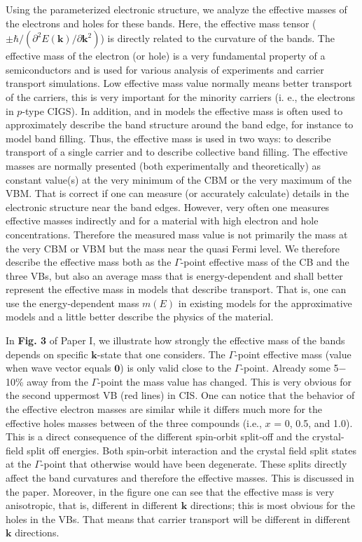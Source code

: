 \documentclass[a4paper, 12pt, titlepage,oneside,drop]{kthesis}
\begin{document}
\begin{enumerate}
Using the parameterized electronic structure, we analyze the effective masses of the electrons and holes for these bands. 
Here, the effective mass tensor ($\pm \hbar / (\partial^2E(\mathbf{k})/\partial{\mathbf{k}^2}) $) is directly related to the curvature of the bands. The effective mass of the electron (or hole) is a very fundamental property of a 
semiconductors and is used for various
analysis of experiments and carrier transport simulations. Low effective mass value normally means better transport of the carriers, this is very important for the minority carriers
(i. e., the electrons in $p$-type CIGS). In addition, and in models the effective mass is often used to approximately describe the band structure around the band edge, for instance to model band filling. Thus, the effective mass
is used in two ways: to describe transport of a single carrier and to describe collective band filling. The effective masses are normally presented (both experimentally and theoretically) as constant value(s) at the very minimum
of the CBM or the very maximum of the VBM. That is correct if one can measure (or accurately calculate) details in the electronic structure near the band edges. However, very often one measures effective masses indirectly and for
a material with high electron and hole concentrations. Therefore the measured mass value is not primarily the mass at the very CBM or VBM but the mass near the quasi Fermi level. We therefore describe the effective mass both
as the $\Gamma$-point effective mass of the CB and the three VBs, but also an average mass that is energy-dependent and shall better represent the effective mass in models that describe transport. That is, one can use the
energy-dependent mass $m(E)$ in existing models for the approximative models and a little better describe the physics of the material.      

In \textbf{Fig. 3} of Paper I, we illustrate how strongly the effective mass of the bands depends on specific $\mathbf{k}$-state that one considers. The $\Gamma$-point effective mass (value when wave vector equals $\mathbf{0}$) 
is only valid close to the $\Gamma$-point. Already some 5$-$10\% away from the $\Gamma$-point the mass value has changed. This is very obvious for the second uppermost VB (red lines) in CIS. One can notice that the behavior of
the effective electron masses are similar while it differs much more for the effective holes masses between of the three compounds (i.e., $x$ = 0, 0.5, and 1.0). 
This is a direct consequence of the different spin-orbit split-off and the crystal-field split off energies. Both spin-orbit interaction and the crystal field split states at the $\Gamma$-point that otherwise would have been 
degenerate. These splits directly affect the band curvatures and therefore the effective masses. This is discussed in the paper. Moreover, in the figure one can see that the effective mass is very anisotropic, that is, different 
in different $\mathbf{k}$ directions; this is most obvious for the holes in the VBs. That means that carrier transport will be different in different $\mathbf{k}$ directions.  




\end{enumerate}
\end{document}
